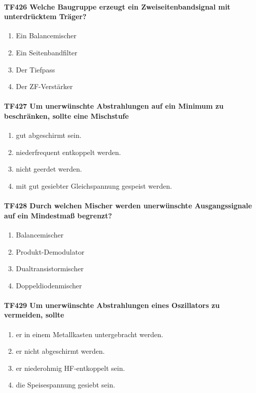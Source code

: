 \documentclass[8pt]{article}
\begin{document}
\paragraph*{TF426 Welche Baugruppe erzeugt ein Zweiseitenbandsignal mit unterdrücktem Träger?}
\begin{enumerate}[nolistsep,label=\Alph*]
\item Ein Balancemischer
\item Ein Seitenbandfilter
\item Der Tiefpass
\item Der ZF-Verstärker
\end{enumerate}

\paragraph*{TF427 Um unerwünschte Abstrahlungen auf ein Minimum zu beschränken, sollte eine Mischstufe} 
\begin{enumerate}[nolistsep,label=\Alph*]
\item gut abgeschirmt sein.
\item niederfrequent entkoppelt werden.
\item nicht geerdet werden.
\item mit gut gesiebter Gleichspannung gespeist werden.
\end{enumerate}

\paragraph*{TF428 Durch welchen Mischer werden unerwünschte Ausgangssignale auf ein Mindestmaß begrenzt?}
\begin{enumerate}[nolistsep,label=\Alph*]
\item Balancemischer
\item Produkt-Demodulator
\item Dualtransistormischer
\item Doppeldiodenmischer
\end{enumerate}

\paragraph*{TF429 Um unerwünschte Abstrahlungen eines Oszillators zu vermeiden, sollte} 
\begin{enumerate}[nolistsep,label=\Alph*]
\item er in einem Metallkasten untergebracht werden.
\item er nicht abgeschirmt werden.
\item er niederohmig HF-entkoppelt sein.
\item die Speisespannung gesiebt sein.
\end{enumerate}
\end{document}
